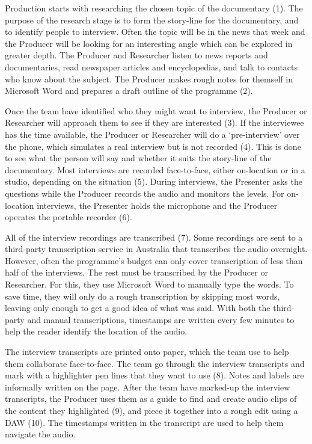 Production starts with researching the chosen topic of the documentary (1).  The purpose of the research stage is to
form the story-line for the documentary, and to identify people to interview.  Often the topic will be in the news that
week and the Producer will be looking for an interesting angle which can be explored in greater depth.  The Producer
and Researcher listen to news reports and documentaries, read newspaper articles and encyclopedias, and talk to
contacts who know about the subject.  The Producer makes rough notes for themself in Microsoft Word and prepares a
draft outline of the programme (2).

Once the team have identified who they might want to interview, the Producer or Researcher will approach them to see if
they are interested (3).  If the interviewee has the time available, the Producer or Researcher will do a
`pre-interview' over the phone, which simulates a real interview but is not recorded (4). This is done to see what the
person will say and whether it suits the story-line of the documentary.  Most interviews are recorded face-to-face,
either on-location or in a studio, depending on the situation (5).  During interviews, the Presenter asks the questions
while the Producer records the audio and monitors the levels.  For on-location interviews, the Presenter holds the
microphone and the Producer operates the portable recorder (6).

All of the interview recordings are transcribed (7). Some recordings are sent to a third-party transcription service in
Australia that transcribes the audio overnight.  However, often the programme's budget can only cover transcription of
less than half of the interviews. The rest must be transcribed by the Producer or Researcher. For this, they use
Microsoft Word to manually type the words.  To save time, they will only do a rough transcription by skipping most
words, leaving only enough to get a good idea of what was said.  With both the third-party and manual transcriptions,
timestamps are written every few minutes to help the reader identify the location of the audio.

The interview transcripts are printed onto paper, which the team use to help them collaborate face-to-face.  The team
go through the interview transcripts and mark with a highlighter pen lines that they want to use (8). Notes and labels
are informally written on the page.  After the team have marked-up the interview transcripts, the Producer uses them as
a guide to find and create audio clips of the content they highlighted (9), and piece it together into a rough edit
using a DAW (10). The timestamps written in the transcript are used to help them navigate the audio.

